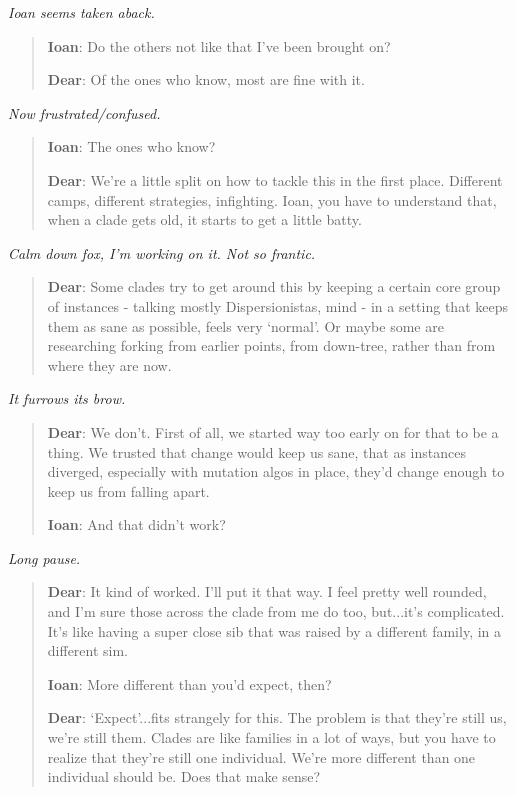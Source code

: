 \emph{Ioan seems taken aback.}

\begin{quote}
\textbf{Ioan}: Do the others not like that I've been brought on?

\textbf{Dear}: Of the ones who know, most are fine with it.
\end{quote}

\emph{Now frustrated/confused.}

\begin{quote}
\textbf{Ioan}: The ones who know?

\textbf{Dear}: We're a little split on how to tackle this in the first place. Different camps, different strategies, infighting. Ioan, you have to understand that, when a clade gets old, it starts to get a little batty.
\end{quote}

\emph{Calm down fox, I'm working on it. Not so frantic.}

\begin{quote}
\textbf{Dear}: Some clades try to get around this by keeping a certain core group of instances - talking mostly Dispersionistas, mind - in a setting that keeps them as sane as possible, feels very `normal'. Or maybe some are researching forking from earlier points, from down-tree, rather than from where they are now.
\end{quote}

\emph{It furrows its brow.}

\begin{quote}
\textbf{Dear}: We don't. First of all, we started way too early on for that to be a thing. We trusted that change would keep us sane, that as instances diverged, especially with mutation algos in place, they'd change enough to keep us from falling apart.

\textbf{Ioan}: And that didn't work?
\end{quote}

\emph{Long pause.}

\begin{quote}
\textbf{Dear}: It kind of worked. I'll put it that way. I feel pretty well rounded, and I'm sure those across the clade from me do too, but...it's complicated. It's like having a super close sib that was raised by a different family, in a different sim.

\textbf{Ioan}: More different than you'd expect, then?

\textbf{Dear}: `Expect'...fits strangely for this. The problem is that they're still us, we're still them. Clades are like families in a lot of ways, but you have to realize that they're still one individual. We're more different than one individual should be. Does that make sense?
\end{quote}

